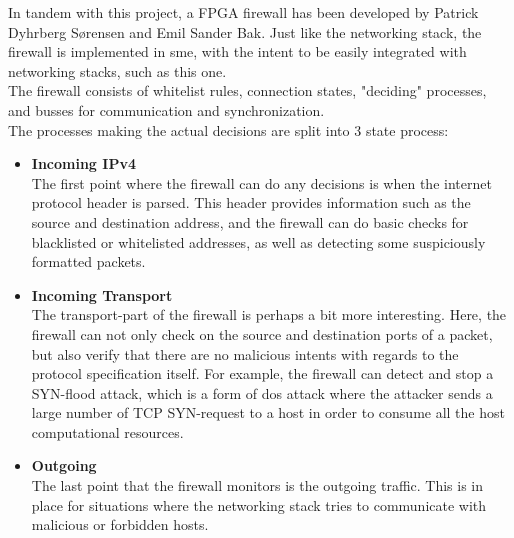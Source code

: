 In tandem with this project, a FPGA firewall has been developed by
Patrick Dyhrberg Sørensen and Emil Sander Bak. Just like the networking stack,
the firewall is implemented in \gls{sme}, with the intent to be easily
integrated with networking stacks, such as this one\cite{fpga_firewall}.\\
The firewall consists of whitelist rules, connection states, "deciding"
processes, and busses for communication and synchronization\cite{fpga_firewall}.\\
The processes making the actual decisions are split into 3 state process:
\begin{itemize}
\item \textbf{Incoming IPv4}\\
The first point where the firewall can do any decisions is when the internet
protocol header is parsed. This header provides information such as the source
and destination address, and the firewall can do basic checks for blacklisted
or whitelisted addresses, as well as detecting some suspiciously formatted
packets.
\item \textbf{Incoming Transport}\\
The transport-part of the firewall is perhaps a bit more interesting. Here,
the firewall can not only check on the source and destination ports of a packet,
but also verify that there are no malicious intents with regards to the protocol
specification itself. For example, the firewall can detect and stop a SYN-flood
attack, which is a form of \gls{dos attack} where the attacker sends a large
number of TCP SYN-request to a host in order to consume all the host
computational resources.

\item \textbf{Outgoing}\\
The last point that the firewall monitors is the outgoing traffic. This is in
place for situations where the networking stack tries to communicate with
malicious or forbidden hosts.
\end{itemize}

